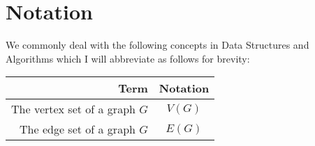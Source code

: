 \section{Notation}

We commonly deal with the following concepts in 
Data Structures and Algorithms
which I will abbreviate as follows for brevity:
\begin{center}
    \begin{tabular}{ | r | c | }
        \hline
        Term & Notation \\
        \hline \hline
        The vertex set of a graph $G$ & $V(G)$ \\
        The edge set of a graph $G$ & $E(G)$ \\
        \hline
    \end{tabular}
\end{center}